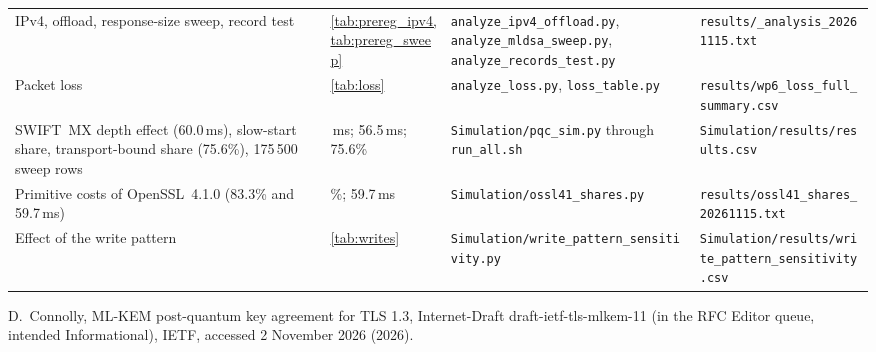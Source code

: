 \documentclass[preprint,12pt]{elsarticle}
\newcommand{\ms}{\,ms\xspace}
\begin{document}
\begin{footnotesize}
\begin{longtable}{@{}>{\raggedright\arraybackslash}p{}>{\raggedright\arraybackslash}p{}>{\raggedright\arraybackslash}p{}>{\raggedright\arraybackslash}p{}@{}}
IPv4, offload, response-size sweep, record test & \cref{tab:prereg_ipv4,tab:prereg_sweep} & \texttt{analyze\_\allowbreak ipv4\_\allowbreak offload.py}, \texttt{analyze\_\allowbreak mldsa\_\allowbreak sweep.py}, \texttt{analyze\_\allowbreak records\_\allowbreak test.py} & \texttt{results/\allowbreak *\_\allowbreak analysis\_\allowbreak 20261115.txt} \\
Packet loss & \cref{tab:loss} & \texttt{analyze\_\allowbreak loss.py}, \texttt{loss\_\allowbreak table.py} & \texttt{results/\allowbreak wp6\_\allowbreak loss\_\allowbreak full\_\allowbreak summary.csv} \\
SWIFT~MX depth effect (60.0\ms), slow-start share, transport-bound share (75.6\%), 175\,500 sweep rows & 60.05\ms; 56.5\ms; 75.6\% & \texttt{Simulation/\allowbreak pqc\_\allowbreak sim.py} through \texttt{run\_\allowbreak all.sh} & \texttt{Simulation/\allowbreak results/\allowbreak results.csv} \\
Primitive costs of OpenSSL~4.1.0 (83.3\% and 59.7\ms) & 83.3\%; 59.7\ms & \texttt{Simulation/\allowbreak ossl41\_\allowbreak shares.py} & \texttt{results/\allowbreak ossl41\_\allowbreak shares\_\allowbreak 20261115.txt} \\
Effect of the write pattern & \cref{tab:writes} & \texttt{Simulation/\allowbreak write\_\allowbreak pattern\_\allowbreak sensitivity.py} & \texttt{Simulation/\allowbreak results/\allowbreak write\_\allowbreak pattern\_\allowbreak sensitivity.csv} \\
\end{longtable}
\end{footnotesize}

\begin{thebibliography}{1}
D.~Connolly, {ML-KEM} post-quantum key agreement for {TLS} 1.3, Internet-Draft
  draft-ietf-tls-mlkem-11 (in the RFC Editor queue, intended Informational),
  {IETF}, accessed 2 November 2026 (2026).
\end{thebibliography}
\end{document}
